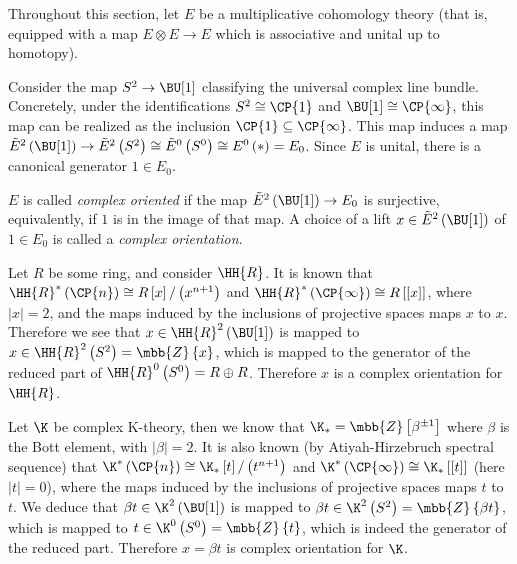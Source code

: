 Throughout this section, let $E$ be a multiplicative cohomology theory (that is, equipped with a map $E \otimes E \to E$ which is associative and unital up to homotopy).

Consider the map $S^2 \to \BU[1]$ classifying the universal complex line bundle.
Concretely, under the identifications $S^2 \cong \CP{1}$ and $\BU[1] \cong \CP{\infty}$, this map can be realized as the inclusion $\CP{1} \subseteq \CP{\infty}$.
This map induces a map
$
\tilde{E}^2\left(\BU[1]\right)
\to \tilde{E}^2\left(S^2\right)
\cong \tilde{E}^0\left(S^0\right)
\cong E^0\left(*\right)
= E_0
$.
Since $E$ is unital, there is a canonical generator $1 \in E_0$.

\begin{definition}
	$E$ is called \emph{complex oriented} if the map $\tilde{E}^2\left(\BU[1]\right) \to E_0$ is surjective, equivalently, if $1$ is in the image of that map.
	A choice of a lift $x \in \tilde{E}^2\left(\BU[1]\right)$ of $1 \in E_0$ is called a \emph{complex orientation}.
\end{definition}

\begin{example*}
	Let $R$ be some ring, and consider $\HH{R}$.
	It is known that
	$\HH{R}^*\left(\CP{n}\right) \cong R \left[x\right] / \left(x^{n+1}\right)$
	and
	$\HH{R}^*\left(\CP{\infty}\right) \cong R \left[\left[x\right]\right]$,
	where $\left|x\right| = 2$,
	and the maps induced by the inclusions of projective spaces maps $x$ to $x$.
	Therefore we see that $x \in \HH{R}^2\left(\BU[1]\right)$ is mapped to $x \in \HH{R}^2\left(S^2\right) = \mbb{Z}\left\{x\right\}$, which is mapped to the generator of the reduced part of $\HH{R}^0\left(S^0\right) = R \oplus R$.
	Therefore $x$ is a complex orientation for $\HH{R}$.
\end{example*}

\begin{example*}
	Let $\K$ be complex K-theory, then we know that $\K_* = \mbb{Z}\left[\beta^{\pm 1}\right]$ where $\beta$ is the Bott element, with $\left|\beta\right| = 2$.
	It is also known (by Atiyah-Hirzebruch spectral sequence) that
	$\K^*\left(\CP{n}\right) \cong \K_* \left[t\right] / \left(t^{n+1}\right)$
	and
	$\K^*\left(\CP{\infty}\right) \cong \K_* \left[\left[t\right]\right]$
	(here $\left|t\right| = 0$),
	where the maps induced by the inclusions of projective spaces maps $t$ to $t$.
	We deduce that $\beta t \in \K^2\left(\BU[1]\right)$ is mapped to $\beta t \in \K^2\left(S^2\right) = \mbb{Z}\left\{\beta t\right\}$, which is mapped to $t \in \K^0\left(S^0\right) = \mbb{Z}\left\{t\right\}$, which is indeed the generator of the reduced part.
	Therefore $x = \beta t$ is complex orientation for $\K$.
\end{example*}

